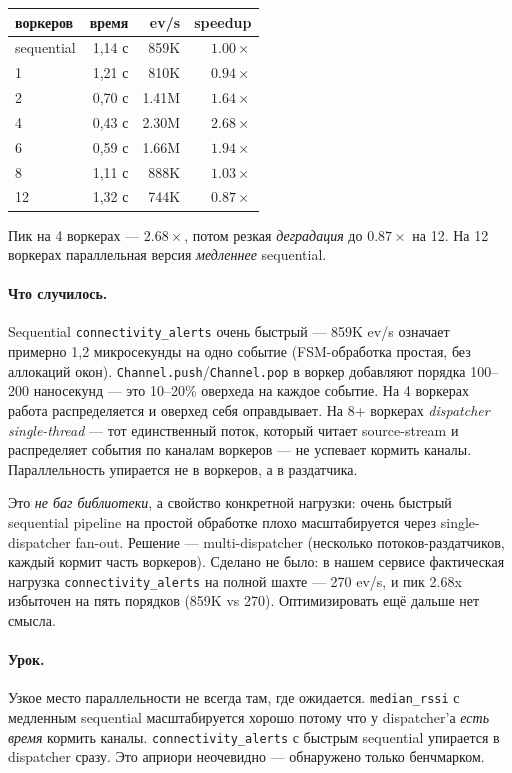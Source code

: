 \begin{center}
\begin{tabular}{lrrr}
\textbf{воркеров} & \textbf{время} & \textbf{ev/s} & \textbf{speedup} \\
\hline
sequential & 1{,}14 с &  859K & $1.00\times$ \\
1          & 1{,}21 с &  810K & $0.94\times$ \\
2          & 0{,}70 с & 1.41M & $1.64\times$ \\
4          & 0{,}43 с & 2.30M & $\mathbf{2.68\times}$ \\
6          & 0{,}59 с & 1.66M & $1.94\times$ \\
8          & 1{,}11 с &  888K & $1.03\times$ \\
12         & 1{,}32 с &  744K & $0.87\times$ \\
\end{tabular}
\end{center}

Пик на 4 воркерах --- $2.68 \times$, потом резкая
\emph{деградация} до $0.87 \times$ на 12. На 12 воркерах
параллельная версия \emph{медленнее} sequential.

\paragraph{Что случилось.} Sequential \texttt{connectivity\_alerts}
очень быстрый --- 859K ev/s означает примерно 1{,}2 микросекунды
на одно событие (FSM-обработка простая, без аллокаций окон).
\texttt{Channel.push}/\texttt{Channel.pop} в воркер добавляют
порядка 100--200 наносекунд --- это 10--20\% оверхеда на каждое
событие. На 4 воркерах работа распределяется и оверхед себя
оправдывает. На 8+ воркерах \emph{dispatcher single-thread} ---
тот единственный поток, который читает source-stream и
распределяет события по каналам воркеров --- не успевает кормить
каналы. Параллельность упирается не в воркеров, а в раздатчика.

Это \emph{не баг библиотеки}, а свойство конкретной нагрузки:
очень быстрый sequential pipeline на простой обработке плохо
масштабируется через single-dispatcher fan-out. Решение ---
multi-dispatcher (несколько потоков-раздатчиков, каждый кормит
часть воркеров). Сделано не было: в нашем сервисе фактическая
нагрузка \texttt{connectivity\_alerts} на полной шахте --- 270
ev/s, и пик 2.68x избыточен на пять порядков (859K vs 270).
Оптимизировать ещё дальше нет смысла.

\paragraph{Урок.} Узкое место параллельности не всегда там, где
ожидается. \texttt{median\_rssi} с медленным sequential
масштабируется хорошо потому что у dispatcher'а \emph{есть время}
кормить каналы. \texttt{connectivity\_alerts} с быстрым sequential
упирается в dispatcher сразу. Это априори неочевидно ---
обнаружено только бенчмарком.

